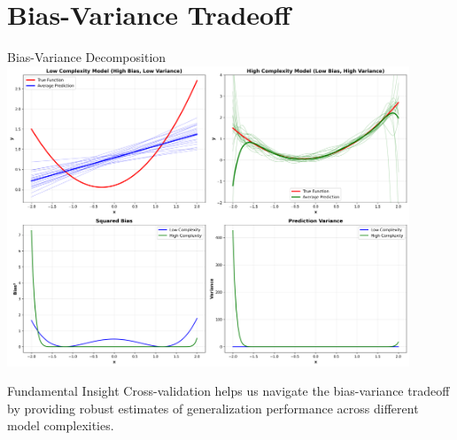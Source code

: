 \documentclass[8pt,aspectratio=1610]{beamer}
\begin{document}

\section{Bias-Variance Tradeoff}

\begin{frame}{Bias-Variance Decomposition}
\centering
\includegraphics[width=0.9\textwidth]{../figures/bias_variance_tradeoff.png}

\vspace{0.3cm}

\begin{alertblock}{Fundamental Insight}
Cross-validation helps us navigate the bias-variance tradeoff by providing robust estimates of generalization performance across different model complexities.
\end{alertblock}
\end{frame}
\end{document}

